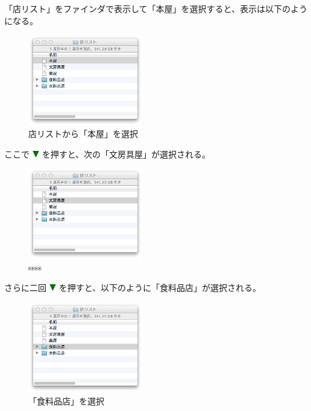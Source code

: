 \documentclass[twoside]{wiss}
\def\figwidth{50mm}
\def\downtriangle{ \includegraphics[width=3mm,bb=0 0 36 36]{figures/downtriangle.pdf} }
\begin{document}
「店リスト」をファインダで表示して「本屋」を選択すると、表示は以下のようになる。

\begin{figure}[H]
\centerline{\includegraphics[width=\figwidth,bb=0 0 344 272]{figures/9b121bec45e5b480e5ac64fdd0f82592.png}}
\caption{店リストから「本屋」を選択}
\label{screenshot2}
\end{figure}

\noindent
ここで{\downtriangle}を押すと、次の「文房具屋」が選択される。

\begin{figure}[H]
\centerline{\includegraphics[width=\figwidth,bb=0 0 344 272]{figures/f43016d1b524baf414f2c32c48fe9588.png}}
\caption{ssss}
\label{「文房具屋」を選択}
\end{figure}

\noindent
さらに二回{\downtriangle}を押すと、以下のように「食料品店」が選択される。

\begin{figure}[H]
\centerline{\includegraphics[width=\figwidth,bb=0 0 344 272]{figures/c074cd6daec3da0341125d1492b8a09c.png}}
\caption{「食料品店」を選択}
\label{screenshot4}
\end{figure}
\end{document}
